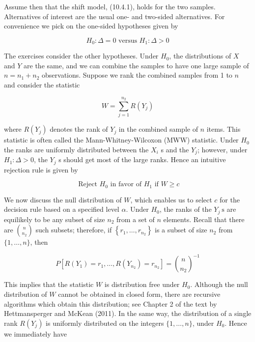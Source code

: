 Assume then that the shift model, (10.4.1), holds for the two samples. Alternatives of interest are the usual one- and two-sided alternatives. For convenience we pick on the one-sided hypotheses given by


\begin{equation*}
H_{0}: \Delta=0 \text { versus } H_{1}: \Delta>0 \tag{10.4.4}
\end{equation*}


The exercises consider the other hypotheses. Under $H_{0}$, the distributions of $X$ and $Y$ are the same, and we can combine the samples to have one large sample of $n=n_{1}+n_{2}$ observations. Suppose we rank the combined samples from 1 to $n$ and consider the statistic


\begin{equation*}
W=\sum_{j=1}^{n_{2}} R\left(Y_{j}\right) \tag{10.4.5}
\end{equation*}


where $R\left(Y_{j}\right)$ denotes the rank of $Y_{j}$ in the combined sample of $n$ items. This statistic is often called the Mann-Whitney-Wilcoxon (MWW) statistic. Under $H_{0}$ the ranks are uniformly distributed between the $X_{i}$ s and the $Y_{j}$; however, under $H_{1}: \Delta>0$, the $Y_{j}$ s should get most of the large ranks. Hence an intuitive rejection rule is given by


\begin{equation*}
\text { Reject } H_{0} \text { in favor of } H_{1} \text { if } W \geq c \tag{10.4.6}
\end{equation*}


We now discuss the null distribution of $W$, which enables us to select $c$ for the decision rule based on a specified level $\alpha$. Under $H_{0}$, the ranks of the $Y_{j} \mathrm{~s}$ are equilikely to be any subset of size $n_{2}$ from a set of $n$ elements. Recall that there are $\binom{n}{n_{2}}$ such subsets; therefore, if $\left\{r_{1}, \ldots, r_{n_{2}}\right\}$ is a subset of size $n_{2}$ from $\{1, \ldots, n\}$, then


\begin{equation*}
P\left[R\left(Y_{1}\right)=r_{1}, \ldots, R\left(Y_{n_{2}}\right)=r_{n_{2}}\right]=\binom{n}{n_{2}}^{-1} \tag{10.4.7}
\end{equation*}


This implies that the statistic $W$ is distribution free under $H_{0}$. Although the null distribution of $W$ cannot be obtained in closed form, there are recursive algorithms which obtain this distribution; see Chapter 2 of the text by Hettmansperger and McKean (2011). In the same way, the distribution of a single rank $R\left(Y_{j}\right)$ is uniformly distributed on the integers $\{1, \ldots, n\}$, under $H_{0}$. Hence we immediately have

